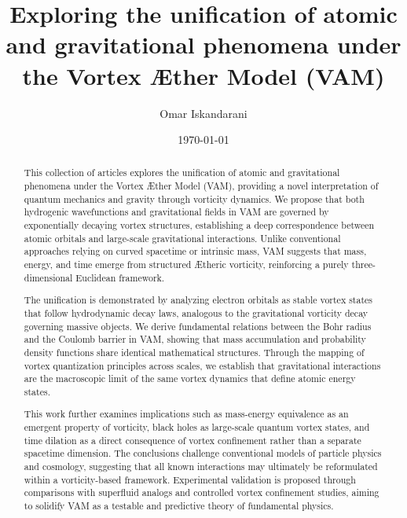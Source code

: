 \documentclass[a4paper,10pt]{article}
\title{Exploring the unification of atomic and gravitational phenomena under the Vortex \AE ther Model (VAM)}
\author{Omar Iskandarani}
\date{\today}
\begin{document}
    \maketitle

    \maketitle

    \begin{abstract}

This collection of articles explores the unification of atomic and gravitational phenomena under the Vortex \AE ther Model (VAM), providing a novel interpretation of quantum mechanics and gravity through vorticity dynamics. We propose that both hydrogenic wavefunctions and gravitational fields in VAM are governed by exponentially decaying vortex structures, establishing a deep correspondence between atomic orbitals and large-scale gravitational interactions. Unlike conventional approaches relying on curved spacetime or intrinsic mass, VAM suggests that mass, energy, and time emerge from structured \AE theric vorticity, reinforcing a purely three-dimensional Euclidean framework.

The unification is demonstrated by analyzing electron orbitals as stable vortex states that follow hydrodynamic decay laws, analogous to the gravitational vorticity decay governing massive objects. We derive fundamental relations between the Bohr radius and the Coulomb barrier in VAM, showing that mass accumulation and probability density functions share identical mathematical structures. Through the mapping of vortex quantization principles across scales, we establish that gravitational interactions are the macroscopic limit of the same vortex dynamics that define atomic energy states.

This work further examines implications such as mass-energy equivalence as an emergent property of vorticity, black holes as large-scale quantum vortex states, and time dilation as a direct consequence of vortex confinement rather than a separate spacetime dimension. The conclusions challenge conventional models of particle physics and cosmology, suggesting that all known interactions may ultimately be reformulated within a vorticity-based framework. Experimental validation is proposed through comparisons with superfluid analogs and controlled vortex confinement studies, aiming to solidify VAM as a testable and predictive theory of fundamental physics.

    \end{abstract}
    
\end{document}
